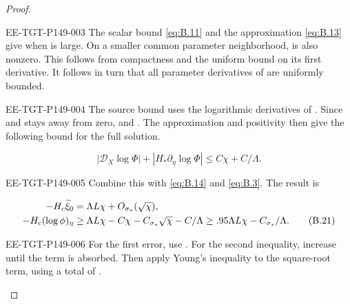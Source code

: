 \begin{proof}
\begin{EESegment}{EE-TGT-P149-003}
The scalar bound \eqref{eq:B.11} and the approximation \eqref{eq:B.13} give
 when  is large. On a smaller
common parameter neighborhood,  is also nonzero. This follows from
compactness and the uniform bound on its first derivative. It follows in turn that all parameter
derivatives of  are uniformly bounded.
\end{EESegment}

\begin{EESegment}{EE-TGT-P149-004}
The source bound uses the logarithmic derivatives of . Since
 and
 stays away from zero,
 and
. The approximation and positivity
then give the following bound for the full solution.
\end{EESegment}
\begin{equation}
  |\mathcal D_X\log\Phi|+|H_*\partial_\eta\log\Phi|\leq C\chi+C/\Lambda.
  \tag{B.20}\label{eq:B.20}
\end{equation}
\begin{EESegment}{EE-TGT-P149-005}
Combine this with \eqref{eq:B.14} and \eqref{eq:B.3}. The result is
\end{EESegment}
\begin{align}
  -H_c\widetilde\xi_0&=\Lambda L\chi+O_{\sigma_*}(\sqrt\chi),\notag\\
  -H_c(\log\phi)_\eta
    &\geq\Lambda L\chi-C\chi-C_{\sigma_*}\sqrt\chi-C/\Lambda
      \geq.95\Lambda L\chi-C_{\sigma_*}/\Lambda.
  \tag{B.21}\label{eq:B.21}
\end{align}
\begin{EESegment}{EE-TGT-P149-006}
For the first error, use
. For the second
inequality, increase  until the term
 is absorbed. Then apply Young's inequality to the square-root term,
using a total of .
\end{EESegment}


\end{proof}
